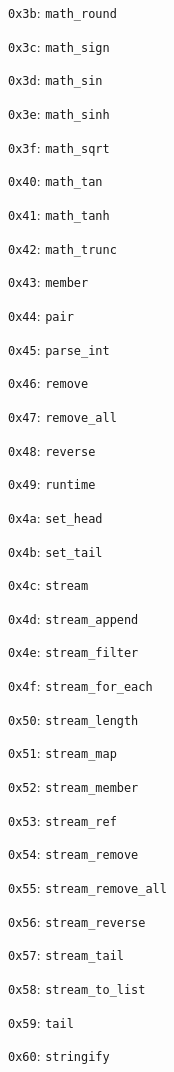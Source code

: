 \begin{tightlist}
\item
  \texttt{0x3b}: \texttt{math\_round}
\item
  \texttt{0x3c}: \texttt{math\_sign}
\item
  \texttt{0x3d}: \texttt{math\_sin}
\item
  \texttt{0x3e}: \texttt{math\_sinh}
\item
  \texttt{0x3f}: \texttt{math\_sqrt}
\item
  \texttt{0x40}: \texttt{math\_tan}
\item
  \texttt{0x41}: \texttt{math\_tanh}
\item
  \texttt{0x42}: \texttt{math\_trunc}
\item
  \texttt{0x43}: \texttt{member}
\item
  \texttt{0x44}: \texttt{pair}
\item
  \texttt{0x45}: \texttt{parse\_int}
\item
  \texttt{0x46}: \texttt{remove}
\item
  \texttt{0x47}: \texttt{remove\_all}
\item
  \texttt{0x48}: \texttt{reverse}
\item
  \texttt{0x49}: \texttt{runtime}
\item
  \texttt{0x4a}: \texttt{set\_head}
\item
  \texttt{0x4b}: \texttt{set\_tail}
\item
  \texttt{0x4c}: \texttt{stream}
\item
  \texttt{0x4d}: \texttt{stream\_append}
\item
  \texttt{0x4e}: \texttt{stream\_filter}
\item
  \texttt{0x4f}: \texttt{stream\_for\_each}
\item
  \texttt{0x50}: \texttt{stream\_length}
\item
  \texttt{0x51}: \texttt{stream\_map}
\item
  \texttt{0x52}: \texttt{stream\_member}
\item
  \texttt{0x53}: \texttt{stream\_ref}
\item
  \texttt{0x54}: \texttt{stream\_remove}
\item
  \texttt{0x55}: \texttt{stream\_remove\_all}
\item
  \texttt{0x56}: \texttt{stream\_reverse}
\item
  \texttt{0x57}: \texttt{stream\_tail}
\item
  \texttt{0x58}: \texttt{stream\_to\_list}
\item
  \texttt{0x59}: \texttt{tail}
\item
  \texttt{0x60}: \texttt{stringify}
\end{tightlist}


